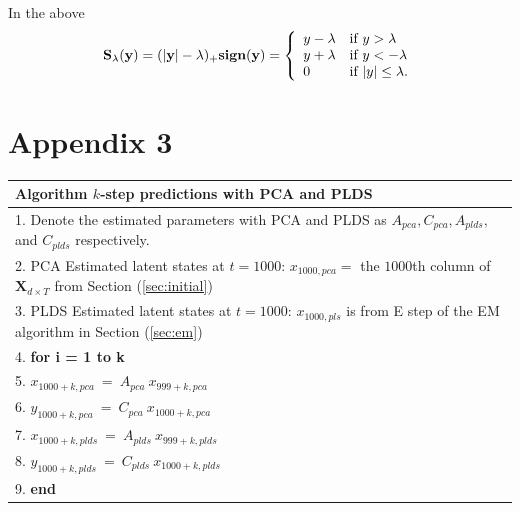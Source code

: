 \documentclass[fleqn]{article}
\let\oldref\ref
\renewcommand{\ref}[1]{(\oldref{#1})}
\begin{document}
\vspace*{10mm}
In the above
\[
\mathbf{S_\lambda (y) = (|y|-\lambda)_{+}\textbf{sign}(y)}=\left\{
\begin{array}{l l }
 y - \lambda & \text{if   } y > \lambda\\
 y + \lambda & \text{if   } y < -\lambda\\
 0 & \text{if   } |y| \leq \lambda .
\end{array}
\right.
\]

\section*{Appendix 3}

\begin{tabular}{l}
\hline
\textbf{Algorithm } $k$-step predictions with PCA and PLDS\\
\hline
 1. Denote the estimated parameters with PCA and PLDS as $A_{pca},C_{pca},A_{plds},$ and $C_{plds}$ respectively.\\
 2. PCA Estimated latent states at $t=1000$: $x_{1000,pca} = $ the $1000$th column of $\mathbf{X}_{d\times T}$ from Section \oldref{sec:initial} \\
 3. PLDS Estimated latent states at $t=1000$: $x_{1000,pls}$ is from E step of the EM algorithm in Section \oldref{sec:em}\\
 4. \textbf{for i = 1 to k}\\
 5. \hspace{10mm}		$x_{1000+k,pca}\ =\ A_{pca}\ x_{999+k,pca}$\\
 6.	\hspace{10mm}	$y_{1000+k,pca}\ =\ C_{pca}\ x_{1000+k,pca}$\\
 7.	\hspace{10mm}	$x_{1000+k,plds}\ =\ A_{plds}\ x_{999+k,plds}$\\
 8.	\hspace{10mm}	$y_{1000+k,plds}\ =\ C_{plds}\ x_{1000+k,plds}$\\
 9. \textbf{end}\\
\hline
\end{tabular}
\newpage


\end{document}
